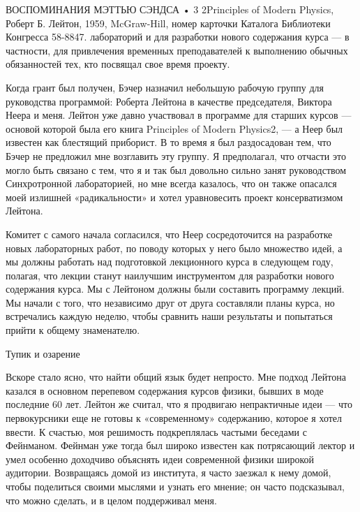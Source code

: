 \documentclass[11pt,oneside]{article}
\begin{document}
ВОСПОМИНАНИЯ МЭТТЬЮ СЭНДСА • 3 2Principles of Modern Physics, Роберт Б. Лейтон, 1959, McGraw-Hill, номер карточки Каталога Библиотеки Конгресса 58-8847. лабораторий и для разработки нового содержания курса --- в частности, для привлечения временных преподавателей к выполнению обычных обязанностей тех, кто посвящал свое время проекту.\par



Когда грант был получен, Бэчер назначил небольшую рабочую группу для руководства программой: Роберта Лейтона в качестве председателя, Виктора Неера и меня. Лейтон уже давно участвовал в программе для старших курсов --- основой которой была его книга Principles of Modern Physics2, --- а Неер был известен как блестящий приборист. В то время я был раздосадован тем, что Бэчер не предложил мне возглавить эту группу. Я предполагал, что отчасти это могло быть связано с тем, что я и так был довольно сильно занят руководством Синхротронной лабораторией, но мне всегда казалось, что он также опасался моей излишней «радикальности» и хотел уравновесить проект консерватизмом Лейтона.\par



Комитет с самого начала согласился, что Неер сосредоточится на разработке новых лабораторных работ, по поводу которых у него было множество идей, а мы должны работать над подготовкой лекционного курса в следующем году, полагая, что лекции станут наилучшим инструментом для разработки нового содержания курса. Мы с Лейтоном должны были составить программу лекций. Мы начали с того, что независимо друг от друга составляли планы курса, но встречались каждую неделю, чтобы сравнить наши результаты и попытаться прийти к общему знаменателю.\par



Тупик и озарение\par



Вскоре стало ясно, что найти общий язык будет непросто. Мне подход Лейтона казался в основном перепевом содержания курсов физики, бывших в моде последние 60 лет. Лейтон же считал, что я продвигаю непрактичные идеи --- что первокурсники еще не готовы к «современному» содержанию, которое я хотел ввести. К счастью, моя решимость подкреплялась частыми беседами с Фейнманом. Фейнман уже тогда был широко известен как потрясающий лектор и умел особенно доходчиво объяснять идеи современной физики широкой аудитории. Возвращаясь домой из института, я часто заезжал к нему домой, чтобы поделиться своими мыслями и узнать его мнение; он часто подсказывал, что можно сделать, и в целом поддерживал меня.\par
\end{document}
